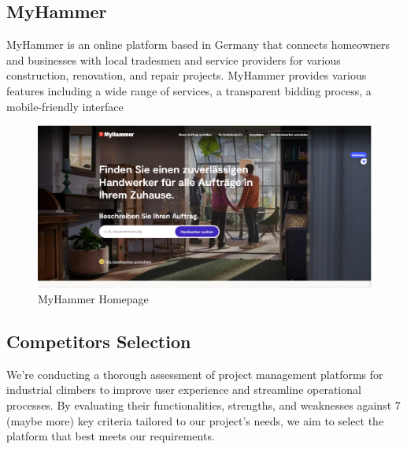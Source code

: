 \subsection{MyHammer}
MyHammer is an online platform based in Germany that connects homeowners and businesses with local tradesmen and service providers for various construction, renovation, and repair projects. MyHammer provides various features including a wide range of services, a transparent bidding process, a mobile-friendly interface

\begin{figure}[H]
    \centering
    \includegraphics[width=\linewidth]{src/assets/chapters/myHammer.PNG}
    \caption{MyHammer Homepage}
    \label{fig:myhammer_image}
\end{figure}

\subsection{Competitors Selection}
We're conducting a thorough assessment of project management platforms for industrial climbers to improve user experience and streamline operational processes. By evaluating their functionalities, strengths, and weaknesses against 7 (maybe more) key criteria tailored to our project's needs, we aim to select the platform that best meets our requirements.

